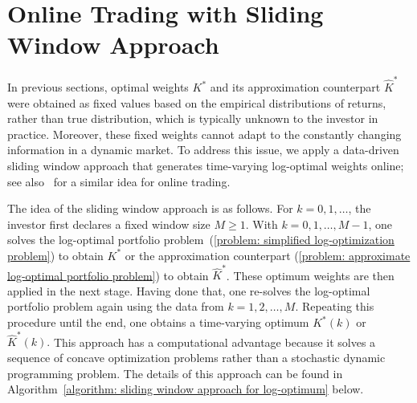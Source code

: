 \documentclass[10pt]{article} %
\begin{document}
	
	
	
	\section{Online Trading with Sliding Window Approach} \label{section: online trading with sliding window approach}
	In previous sections, optimal weights $K^*$ and its approximation counterpart $\widehat{K}^*$ were obtained as fixed values based on the empirical distributions of returns, rather than true distribution, which is typically unknown to the investor in practice. 
	Moreover, these fixed weights cannot adapt to the constantly changing information in a dynamic market. 
	To address this issue, we apply a data-driven sliding window approach that generates time-varying log-optimal weights online; see also~\cite{wang2022data} for a similar idea for online trading.
	
	The idea of the sliding window approach is as follows. For $k=0,1,\dots$, the investor first declares a fixed window size $M \geq 1$. With $k=0,1, \dots, M-1$, one solves the log-optimal portfolio problem~(\ref{problem: simplified log-optimization problem}) to obtain $K^*$ or the approximation counterpart (\ref{problem: approximate log-optimal portfolio problem}) to obtain $\widehat{K}^*$. 
	These optimum weights are then applied in the next stage.
	Having done that, one re-solves the log-optimal portfolio problem again using the data from $k=1,2,\dots, M$. 
	Repeating this procedure until the end, one obtains a time-varying optimum $K^*(k)$ or $\widehat{K}^*(k).$ 
	This approach has a computational advantage because it solves a sequence of concave optimization problems rather than a stochastic dynamic programming problem.
	The details of this approach can be found in 
	Algorithm~\ref{algorithm: sliding window approach for log-optimum} below.
	
\end{document}
